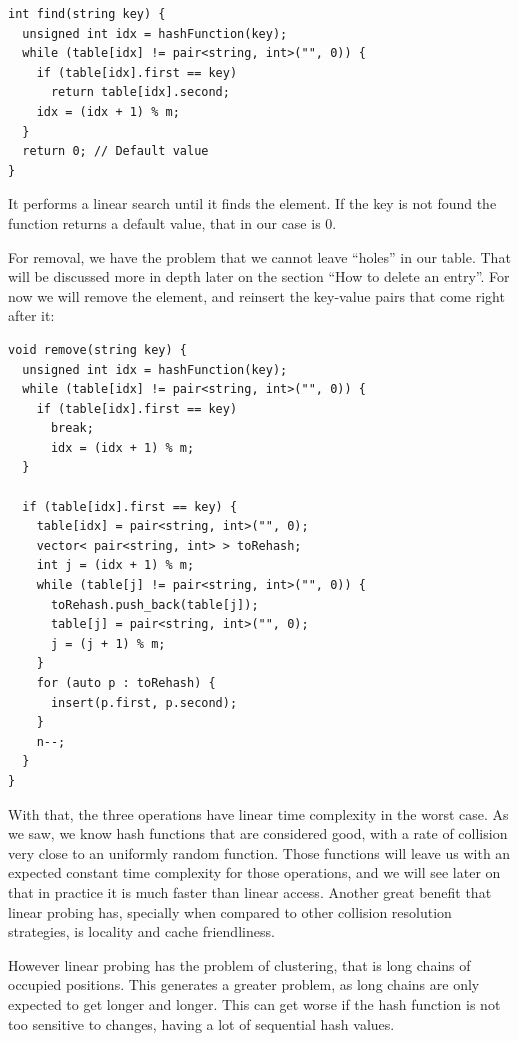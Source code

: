 \newpage

\begin{lstlisting}
int find(string key) {
  unsigned int idx = hashFunction(key);
  while (table[idx] != pair<string, int>("", 0)) {
    if (table[idx].first == key) 
      return table[idx].second;
    idx = (idx + 1) % m;
  }
  return 0; // Default value
}
\end{lstlisting}

It performs a linear search until it finds the element. If the key is not found the function returns a default value, that in our case is 0. 

For removal, we have the problem that we cannot leave ``holes'' in our table. That will be discussed more in depth later on the section ``How to delete an entry''. For now we will remove the element, and reinsert the key-value pairs that come right after it:

\begin{lstlisting}
void remove(string key) {
  unsigned int idx = hashFunction(key);
  while (table[idx] != pair<string, int>("", 0)) {
    if (table[idx].first == key) 
      break;
      idx = (idx + 1) % m;
  }
    
  if (table[idx].first == key) {
    table[idx] = pair<string, int>("", 0);
    vector< pair<string, int> > toRehash;
    int j = (idx + 1) % m;
    while (table[j] != pair<string, int>("", 0)) {
      toRehash.push_back(table[j]);
      table[j] = pair<string, int>("", 0);
      j = (j + 1) % m;
    }
    for (auto p : toRehash) {
      insert(p.first, p.second);
    }
    n--;
  }  
}
\end{lstlisting}

With that, the three operations have linear time complexity in the worst case. As we saw, we know hash functions that are considered good, with a rate of collision very close to an uniformly random function. Those functions will leave us with an expected constant time complexity for those operations, and we will see later on that in practice it is much faster than linear access. Another great benefit that linear probing has, specially when compared to other collision resolution strategies, is locality and cache friendliness.

However linear probing has the problem of clustering, that is long chains of occupied positions. This generates a greater problem, as long chains are only expected to get longer and longer. This can get worse if the hash function is not too sensitive to changes, having a lot of sequential hash values. 

